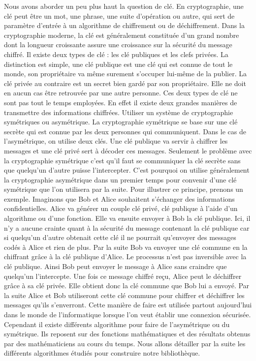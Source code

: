 Nous avons aborder un peu plus haut la question de clé. En cryptographie, une clé peut être un mot, une phrase, une suite d’opération ou autre, qui sert de paramètre d’entrée à un algorithme de chiffrement ou de déchiffrement. Dans la cryptographie moderne, la clé est généralement constituée d’un grand nombre dont la longueur croissante assure une croissance sur la sécurité du message chiffré. Il existe deux types de clé : les clé publiques et les clefs privées. La distinction est simple, une clé publique est une clé qui est connue de tout le monde, son propriétaire va même surement s’occuper lui-même de la publier. La clé privée au contraire est un secret bien gardé par son propriétaire. Elle ne doit en aucun cas être retrouvée par une autre personne. Ces deux types de clé ne sont pas tout le temps employées. En effet il existe deux grandes manières de transmettre des informations chiffrées. Utiliser un système de cryptographie symétriques ou asymétrique. La cryptographie symétrique se base sur une clé secrète qui est connue par les deux personnes qui communiquent. Dans le cas de l’asymétrique, on utilise deux clés. Une clé publique va servir à chiffrer les messages et une clé privé sert à décoder ces messages. Seulement le problème avec la cryptographie symétrique c’est qu’il faut se communiquer la clé secrète sans que quelqu’un d’autre puisse l’intercepter. C’est pourquoi on utilise généralement la cryptographie asymétrique dans un premier temps pour convenir d’une clé symétrique que l’on utilisera par la suite. Pour illustrer ce principe, prenons un exemple. Imaginons que Bob et Alice souhaitent s’échanger des informations confidentielles. Alice va générer un couple clé privé, clé publique à l’aide d’un algorithme ou d’une fonction. Elle va ensuite envoyer à Bob la clé publique. Ici, il n’y a aucune crainte quant à la sécurité du message contenant la clé publique car si quelqu’un d’autre obtenait cette clé il ne pourrait qu’envoyer des messages codés à Alice et rien de plus. Par la suite Bob va envoyer une clé commune en la chiffrant grâce à la clé publique d’Alice. Le processus n’est pas inversible avec la clé publique. Ainsi Bob peut envoyer le message à Alice sans craindre que quelqu’un l’intercepte. Une fois ce message chiffré reçu, Alice peut le déchiffrer grâce à sa clé privée. Elle obtient donc la clé commune que Bob lui a envoyé. Par la suite Alice et Bob utiliseront cette clé commune pour chiffrer et déchiffrer les messages qu’ils s’enverront. Cette manière de faire est utilisée partout aujourd’hui dans le monde de l’informatique lorsque l’on veut établir une connexion sécurisée. Cependant il existe différents algorithme pour faire de l’asymétrique ou du symétrique. Ils reposent sur des fonctions mathématiques et des résultats obtenus par des mathématiciens au cours du temps. Nous allons détailler par la suite les différents algorithmes étudiés pour construire notre bibliothèque.
